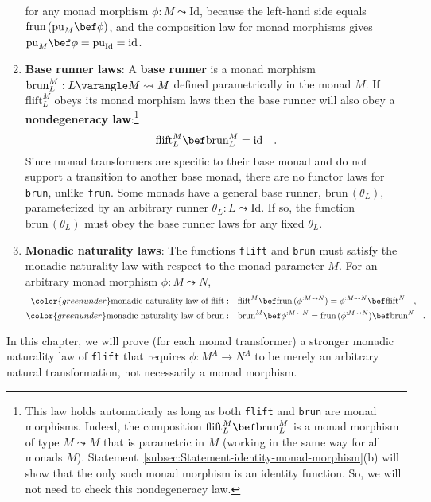 \begin{enumerate}
\[\]
for any monad morphism $\phi:M\leadsto\text{Id}$, because the left-hand
side equals $\text{frun}\,(\text{pu}_{M}\bef\phi)$, and the composition
law for monad morphisms gives $\text{pu}_{M}\bef\phi=\text{pu}_{\text{Id}}=\text{id}$.
\item \textbf{Base runner laws}:
A \textbf{base runner} is a monad morphism $\text{brun}_{L}^{M}:L\varangle M\leadsto M$
defined parametrically in the monad $M$. If $\text{flift}_{L}^{M}$
obeys its monad morphism laws then the base runner will also obey
a \textbf{nondegeneracy law}:\footnote{This law holds automaticaly as long as both \lstinline!flift! and
\lstinline!brun! are monad morphisms. Indeed, the composition $\text{flift}_{L}^{M}\bef\text{brun}_{L}^{M}$
is a monad morphism of type $M\leadsto M$ that is parametric in $M$
(working in the same way for all monads $M$). Statement~\ref{subsec:Statement-identity-monad-morphism}(b)
will show that the only such monad morphism is an identity function.
So, we will not need to check this nondegeneracy law.}
\[
\text{flift}_{L}^{M}\bef\text{brun}_{L}^{M}=\text{id}\quad.
\]
Since monad transformers are specific to their base monad and do not
support a transition to another base monad, there are no functor laws
for \lstinline!brun!, unlike \lstinline!frun!. Some monads have
a general base runner, $\text{brun}\,(\theta_{L})$, parameterized
by an arbitrary runner $\theta_{L}:L\leadsto\text{Id}$. If so, the
function $\text{brun}\,(\theta_{L})$ must obey the base runner laws
for any fixed $\theta_{L}$.
\item \textbf{Monadic naturality laws}: 
The functions \lstinline!flift! and \lstinline!brun! must satisfy
the monadic naturality law with respect to the monad parameter $M$.
For an arbitrary monad morphism $\phi:M\leadsto N$,
\begin{align*}
{\color{greenunder}\text{monadic naturality law of }\text{flift}:}\quad & \text{flift}^{M}\bef\text{frun}\,(\phi^{:M\leadsto N})=\phi^{:M\leadsto N}\bef\text{flift}^{N}\quad,\\
{\color{greenunder}\text{monadic naturality law of }\text{brun}:}\quad & \text{brun}^{M}\bef\phi^{:M\leadsto N}=\text{frun}\,(\phi^{:M\leadsto N})\bef\text{brun}^{N}\quad.
\end{align*}
\end{enumerate}
In this chapter, we will prove (for each monad transformer) a stronger
monadic naturality law of \lstinline!flift! that requires $\phi:M^{A}\rightarrow N^{A}$
to be merely an arbitrary natural transformation, not necessarily
a monad morphism.

